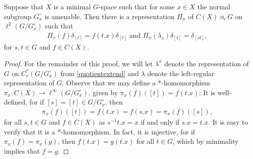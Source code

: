 \begin{lemma}
	Suppose that $X$ is a minimal $G$-space such that for some $x \in X$ the normal subgroup $G_x^\circ$ is amenable. Then there is a representation $\Pi_x$ of $C(X) \rtimes_r G$ on $\ell^2(G/G_x^\circ)$ such that
	\begin{align*}
		\Pi_x(f)\delta_{[t]} = f(t.x)\delta_{[t]} \text{  and  } \Pi_x(\lambda_s)\delta_{[t]} = \delta_{[st]},
	\end{align*}
	for $s,t \in G$ and $f \in C(X)$.
	\label{CXGrep}
\end{lemma}
\begin{proof}
	For the remainder of this proof, we will let $\lambda^x$ denote the representation of $G$ on $C_r^*(G/G_x^\circ)$ from \cref{quotientextend} and $\lambda$ denote the left-regular representation of $G$. Observe that we may define a $*$-homomorphism $\pi_x \colon C(X) \to \ell^\infty(G/G_x^\circ)$, given by $\pi_x(f)([t])=f(t.x)$: It is well-defined, for if $[s]=[t] \in G/G_x^\circ$, then 
	\begin{align*}
		\pi_x(f)([t])=f(t.x) = f(s.x) = \pi_x(f)([s]),
	\end{align*}
	for all $s,t \in G$ and $f \in C(X)$ as $s^{-1}t.x = x$ if and only if $s.x=t.x$. It is easy to verify that it is a $*$-homomorphism. In fact, it is injective, for if $\pi_x(f) = \pi_x(g)$, then $f(t.x)=g(t.x)$ for all $t \in G$, which by minimality implies that $f=g$.
	

\end{proof}
